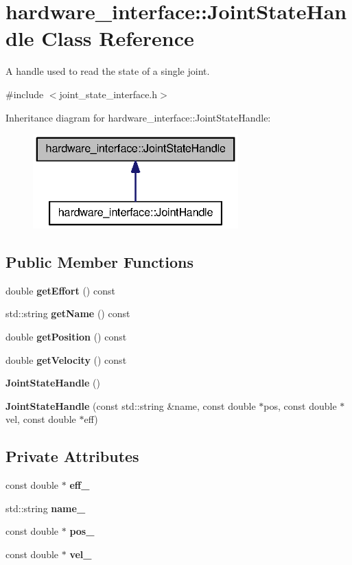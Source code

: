 \section{hardware\-\_\-interface\-:\-:\-Joint\-State\-Handle \-Class \-Reference}
\label{classhardware__interface_1_1JointStateHandle}


\-A handle used to read the state of a single joint.  




{\ttfamily \#include $<$joint\-\_\-state\-\_\-interface.\-h$>$}



\-Inheritance diagram for hardware\-\_\-interface\-:\-:\-Joint\-State\-Handle\-:
\nopagebreak
\begin{figure}[H]
\begin{center}
\leavevmode
\includegraphics[width=224pt]{classhardware__interface_1_1JointStateHandle__inherit__graph}
\end{center}
\end{figure}
\subsection*{\-Public \-Member \-Functions}
\begin{DoxyCompactItemize}
\item 
double {\bf get\-Effort} () const 
\item 
std\-::string {\bf get\-Name} () const 
\item 
double {\bf get\-Position} () const 
\item 
double {\bf get\-Velocity} () const 
\item 
{\bf \-Joint\-State\-Handle} ()
\item 
{\bf \-Joint\-State\-Handle} (const std\-::string \&name, const double $\ast$pos, const double $\ast$vel, const double $\ast$eff)
\end{DoxyCompactItemize}
\subsection*{\-Private \-Attributes}
\begin{DoxyCompactItemize}
\item 
const double $\ast$ {\bf eff\-\_\-}
\item 
std\-::string {\bf name\-\_\-}
\item 
const double $\ast$ {\bf pos\-\_\-}
\item 
const double $\ast$ {\bf vel\-\_\-}
\end{DoxyCompactItemize}


